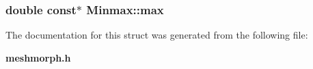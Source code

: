 \subsubsection{\setlength{\rightskip}{0pt plus 5cm}double const$\ast$ {\bf Minmax::max}}\label{structMinmax_b517182417d2fec025570e9ef7cc1f03}




The documentation for this struct was generated from the following file:\begin{CompactItemize}
\item 
{\bf meshmorph.h}\end{CompactItemize}

